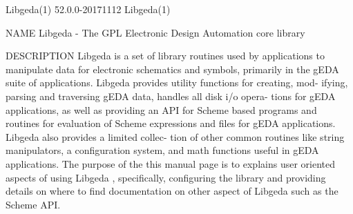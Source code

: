 Libgeda(1)                      52.0.0-20171112                     Libgeda(1)



NAME
       Libgeda - The GPL Electronic Design Automation core library

DESCRIPTION
       Libgeda is a set of library routines used by applications to manipulate
       data for electronic schematics and symbols, primarily in the gEDA suite
       of applications.  Libgeda provides utility functions for creating, mod-
       ifying, parsing and traversing gEDA data, handles all disk  i/o  opera-
       tions  for  gEDA  applications,  as well as providing an API for Scheme
       based programs and routines for evaluation of  Scheme  expressions  and
       files  for  gEDA applications.  Libgeda also provides a limited collec-
       tion of other common routines like string manipulators, a configuration
       system,  and math functions useful in gEDA applications. The purpose of
       the this manual page is to explains  user  oriented  aspects  of  using
       Libgeda  ,  specifically, configuring the library and providing details
       on where to find documentation on other aspect of Libgeda such  as  the
       Scheme API.

